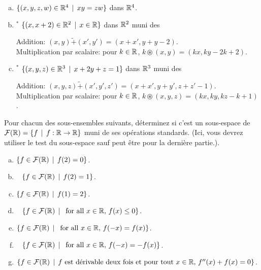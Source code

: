 \begin{prob}
\begin{enumerate}[a)]
\item  $\{(x, y, z, w) \in \mathbb{R}^4\, \mid \, xy=zw \}$ dans $\mathbb{R}^4$.  \medskip

\item$^\ast$  $\{(x, x+2) \in \mathbb{R}^2\, \mid \, x\in \mathbb{R}\}$ dans $\mathbb{R}^2$ muni des  

Addition: $(x,y) \tilde+ (x',y')=(x+x', y+y -2)$.\\ 
Multiplication par scalaire: pour $k\in \mathbb{R}$, $k\circledast (x,y)=(kx, ky-2k+2)$.     \medskip

\item$^\ast$  $\{(x, y, z) \in \mathbb{R}^3\, \mid \, x+2y+z=1 \}$ dans $\mathbb{R}^3$ muni des  

Addition: $(x,y,z) \tilde+ (x',y',z')=(x+x', y+y',z+z'-1).$\\ 
Multiplication par scalaire: pour $k\in \mathbb{R}$, $k\circledast (x,y,z)=(kx, ky, kz-k+1)$. \medskip 

\end{enumerate}
\end{prob} \begin{prob} \label{prob05.2}  Pour chacun des sous-ensembles suivants, déterminez si c'est un sous-espace de $\mathcal{F}(\mathbb{R})=\{f \, \mid \, f : \mathbb{R} \to \mathbb{R}\}$ muni de ses opérations standards. (Ici, vous devrez utiliser le test du sous-espace sauf peut \^etre pour la derni\`ere partie.).  
 
\begin{enumerate}[a)]\medskip
\item  $\{f \in \mathcal{F}(\mathbb{R}) \, \mid \, f(2)=0 \}$. \medskip \medskip

\item\sov~ $\{f \in \mathcal{F}(\mathbb{R}) \, \mid \, f(2)=1 \}$.\medskip \medskip
 

\item  $\{f \in \mathcal{F}(\mathbb{R}) \, \mid \, f(1)=2 \}$.\medskip \medskip

\item\sov~ $\{f \in \mathcal{F}(\mathbb{R}) \, \mid \, \text{ for all } x\in \mathbb{R},   \, f(x)\le 0\}$.\medskip 

\item  $\{f \in \mathcal{F}(\mathbb{R}) \, \mid \, \text{ for all } x\in \mathbb{R},   \, f(-x)= f(x)\}$.\medskip 

\item\sov~ $\{f \in \mathcal{F}(\mathbb{R}) \, \mid \, \text{ for all } x\in \mathbb{R},   \, f(-x)= -f(x)\}$.\medskip 





\item $\{f \in \mathcal{F}(\mathbb{R})   \, \mid \, \text{$f$ est d\'erivable deux fois et pour tout } x\in \mathbb{R},   \, f''(x)+ f(x)=0\}$.\medskip 


\end{enumerate}
\end{prob}
